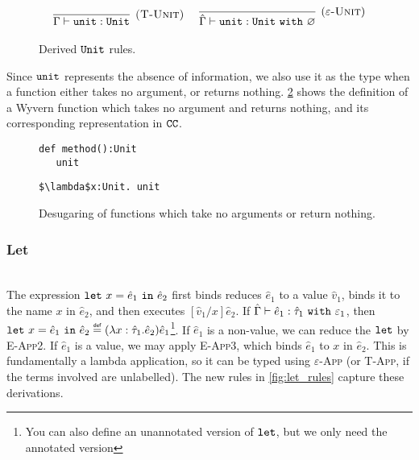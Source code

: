 \begin{figure}[h]


 \\


\[
\begin{array}{c}

\infer[\textsc{(T-Unit)}]
	{\Gamma \vdash \unit : \Unit}
	{} ~~~~

\infer[(\textsc{$\varepsilon$-Unit})]
	{\hat \Gamma \vdash \unit : \Unit~\kw{with} \varnothing}
	{}

\end{array}
\]

\caption{Derived $\mathtt{Unit}$ rules.}
\label{fig:unit_rules}
\end{figure}

Since $\mathtt{unit}$ represents the absence of information, we also use it as the type when a function either takes no argument, or returns nothing. \ref{fig:unit_sugaring} shows the definition of a Wyvern function which takes no argument and returns nothing, and its corresponding representation in $\mathtt{CC}$.

\begin{figure}[h]

\begin{lstlisting}
def method():Unit
   unit
\end{lstlisting}

\begin{lstlisting}
$\lambda$x:Unit. unit
\end{lstlisting}

\caption{Desugaring of functions which take no arguments or return nothing.}
\label{fig:unit_sugaring}
\end{figure}

\subsubsection{Let}~\\

\noindent
The expression $\mathtt{let}~ x = \hat e_1~\mathtt{in}~ \hat e_2$ first binds reduces $\hat e_1$ to a value $\hat v_1$, binds it to the name $x$ in $\hat e_2$, and then executes $[\hat v_1/x]\hat e_2$. If $\hat \Gamma \vdash \hat e_1: \hat \tau_1~\mathtt{with}~ \varepsilon_1$, then $\letxpr{x}{\hat e_1}{\hat e_2} \defn (\lambda x: \hat \tau_1 . \hat e_2) \hat e_1$\footnote{You can also define an unannotated version of $\mathtt{let}$, but we only need the annotated version}. If $\hat e_1$ is a non-value, we can reduce the $\mathtt{let}$ by \textsc{E-App2}. If $\hat e_1$ is a value, we may apply \textsc{E-App3}, which binds $\hat e_1$ to $x$ in $\hat e_2$. This is fundamentally a lambda application, so it can be typed using \textsc{$\varepsilon$-App} (or \textsc{T-App}, if the terms involved are unlabelled). The new rules in \ref{fig:let_rules} capture these derivations.


